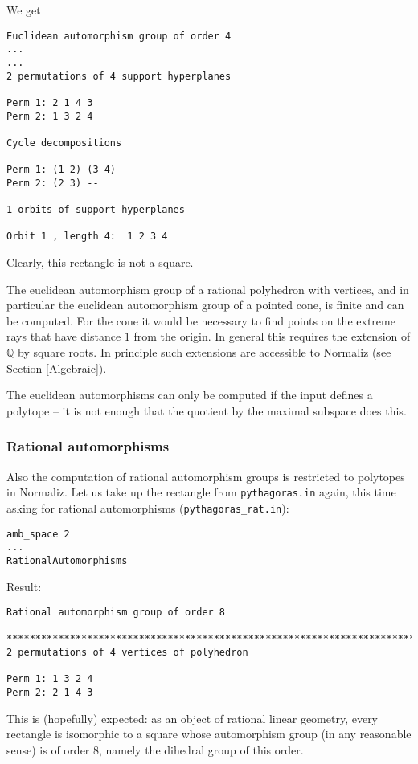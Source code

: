 \documentclass[12pt,a4paper]{scrartcl}
\theoremstyle{definition}
\def\QQ{{\mathbb Q}}
\begin{document}
{We get
\begin{Verbatim}
Euclidean automorphism group of order 4
...
...
2 permutations of 4 support hyperplanes

Perm 1: 2 1 4 3
Perm 2: 1 3 2 4

Cycle decompositions 

Perm 1: (1 2) (3 4) --
Perm 2: (2 3) --

1 orbits of support hyperplanes

Orbit 1 , length 4:  1 2 3 4
\end{Verbatim}
Clearly, this rectangle is not a square.

The euclidean automorphism group of a rational polyhedron with vertices, and in particular the euclidean automorphism group of a pointed cone, is finite and can be computed. For the cone it would be necessary to find points on the extreme rays that have distance $1$ from the origin. In general this requires the extension of $\QQ$ by square roots. In principle such extensions are accessible to Normaliz (see Section \ref{Algebraic}).

The euclidean automorphisms can only be computed if the input defines a polytope -- it is not enough that the quotient by the maximal subspace does this. 


\subsubsection{Rational automorphisms}

Also the computation of rational automorphism groups is restricted to polytopes in Normaliz. Let us take up the rectangle from \verb|pythagoras.in| again, this time asking for rational automorphisms (\verb|pythagoras_rat.in|):
\begin{Verbatim}
amb_space 2
...
RationalAutomorphisms
\end{Verbatim}

Result:
\begin{Verbatim}
Rational automorphism group of order 8

************************************************************************
2 permutations of 4 vertices of polyhedron

Perm 1: 1 3 2 4
Perm 2: 2 1 4 3
\end{Verbatim}
This is (hopefully) expected: as an object of rational linear geometry, every rectangle is isomorphic to a square whose automorphism group (in any reasonable sense) is of order $8$, namely the dihedral group of this order.

}
\end{document}
